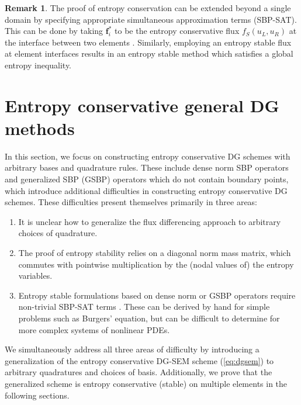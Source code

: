 \documentclass[preprint,10pt]{article}
\theoremstyle{definition}
\theoremstyle{lemma}
\newtheorem*{remark}{Remark}
\theoremstyle{theorem}
\begin{document}
\begin{remark}
The proof of entropy conservation can be extended beyond a single domain by specifying appropriate simultaneous approximation terms (SBP-SAT).  This can be done by taking $\bm{f}_i^*$ to be the entropy conservative flux $f_S(u_L,u_R)$ at the interface between two elements \cite{carpenter2014entropy,gassner2017br1,chen2017entropy}.  Similarly, employing an entropy stable flux at element interfaces results in an entropy stable method which satisfies a global entropy inequality.  
\end{remark}


\section{Entropy conservative general DG methods}

In this section, we focus on constructing entropy conservative DG schemes with arbitrary bases and quadrature rules.  These include dense norm SBP operators and generalized SBP (GSBP) operators which do not contain boundary points, which introduce additional difficulties in constructing entropy conservative DG schemes.  These difficulties present themselves primarily in three areas:
\begin{enumerate}
\item It is unclear how to generalize the flux differencing approach to arbitrary choices of quadrature.  
\item The proof of entropy stability relies on a diagonal norm mass matrix, which commutes with pointwise multiplication by the (nodal values of) the entropy variables.  
\item Entropy stable formulations based on dense norm or GSBP operators require non-trivial SBP-SAT terms \cite{ranocha2017extended}.  These can be derived by hand for simple problems such as Burgers' equation, but can be difficult to determine for more complex systems of nonlinear PDEs.  
\end{enumerate}

We simultaneously address all three areas of difficulty by introducing a generalization of the entropy conservative DG-SEM scheme (\ref{eq:dgsem}) to arbitrary quadratures and choices of basis.  Additionally, we prove that the generalized scheme is entropy conservative (stable) on multiple elements in the following sections.  

\end{document}
